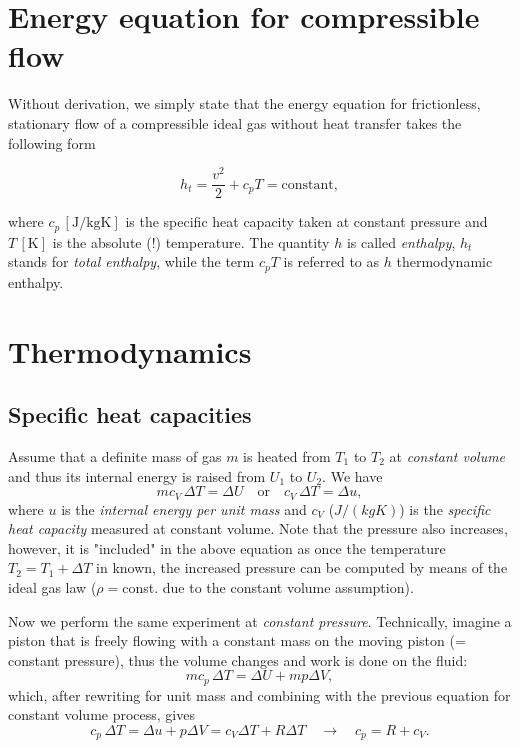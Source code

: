 \section{Energy equation for compressible flow}

Without derivation, we simply state that the energy equation for frictionless, stationary flow of a compressible ideal gas without heat transfer
takes the following form

\begin{equation}
h_t=\frac{v^2}{2}+c_p T=\mathrm{constant},
\end{equation}

where $c_p\,[\mathrm{J/kgK}]$ is the specific heat capacity taken at constant pressure and $T\,[\mathrm{K}]$ is the absolute (!) temperature. The quantity $h$ is called \emph{enthalpy}, $h_t$ stands for \emph{total enthalpy}, while the term $c_pT$ is referred to as $h$ thermodynamic enthalpy.

\section{Thermodynamics}

\subsection{Specific heat capacities}

Assume that a definite mass of gas $m$ is heated from $T_1$ to $T_2$ at \emph{constant volume} and thus its internal energy is raised from $U_1$ to $U_2$. We have
%
\begin{equation}
m c_V\, \Delta T=\Delta U \quad \text{or} \quad c_V\,\Delta T=\Delta u,
\end{equation}
%
where $u$ is the \emph{internal energy per unit mass} and $c_V$ ($J/(kgK)$) is the \emph{specific heat capacity} measured at constant volume. Note that the pressure also increases, however, it is "included" in the above equation as once the temperature $T_2=T_1+\Delta T$ in known, the increased pressure can be computed by means of the ideal gas law ($\rho=$const. due to the constant volume assumption).

Now we perform the same experiment at \emph{constant pressure}. Technically, imagine a piston that is freely flowing with a constant mass on the moving piston (= constant pressure), thus the volume changes and work is done on the fluid:
%
\begin{equation}
m c_p\, \Delta T=\Delta U + m p \Delta V,
\end{equation}
%
which, after rewriting for unit mass and combining with the previous equation for constant volume process,  gives
%
\begin{equation}
c_p\,\Delta T=\Delta u+p \Delta V=c_V \Delta T + R \Delta T \quad \rightarrow \quad c_p=R+c_V.
\end{equation}

